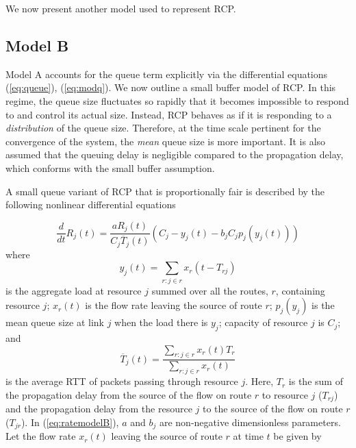 \documentclass[conference]{IEEEtran}
\begin{document}
We now present another model used to represent RCP.

\subsection{Model B}
Model A accounts for the queue term explicitly via the differential equations (\ref{eq:queue}), (\ref{eq:modq}).
We now outline a small buffer model of RCP. In this regime, the queue size fluctuates so rapidly that it becomes impossible to respond to and 
control its actual size. Instead, RCP behaves as if it is responding to a \emph{ 
distribution} of the queue size. Therefore, at the time scale pertinent for the convergence of
the system, the \textit{mean} queue size is more important. It is also assumed that the queuing delay is negligible 
compared to the propagation delay, which conforms with the small buffer assumption.

A small queue variant of RCP that is proportionally fair is described by the following 
nonlinear differential equations \cite{krv}   

\begin{equation}
\label{eq:ratemodelB}
\frac{d}{dt}R_{j}\left(t\right) = \frac{aR_{j}\left(t\right)}{C_{j}\overline{T}_{j}\left(t\right)}\left(C_{j} - y_{j}\left(t\right) - b_{j}C_{j}p_{j}\left(y_{j}\left(t\right)\right)\right)
\end{equation}
where 
\begin{equation}
\label{eq:modelB_2}
y_{j}\left(t\right) = \sum_{r:j\in r} x_{r}\left(t - T_{rj}\right)
\end{equation}
is the aggregate load at resource $j$ summed over all the routes, $r$, containing resource $j$; 
$x_{r}\left(t\right)$ is the flow rate leaving the source of route $r$; $p_{j}\left(y_{j}\right)$ 
is the mean queue size at link $j$ when the load there is $y_{j}$; capacity of resource $j$ is $C_{j}$; and
\begin{equation}
\overline{T}_{j}\left(t\right) = \frac{\sum_{r:j\in r}x_{r}\left(t\right)T_{r}}{\sum_{r:j\in r}x_{r}\left(t\right)}
\end{equation}
is the average RTT of packets passing through resource $j$. Here, 
$T_{r}$ is the sum of the propagation delay from the source of the flow on route $r$ to resource $j$ ($T_{rj}$) 
and the propagation delay from the resource $j$ to the source of the flow on route $r$ ($T_{jr}$). In (\ref{eq:ratemodelB}), $a$ and $b_{j}$ are non-negative dimensionless parameters. Let the flow rate
 $x_{r}\left(t\right)$ leaving the source of route $r$ at time $t$ be given by
\end{document}
